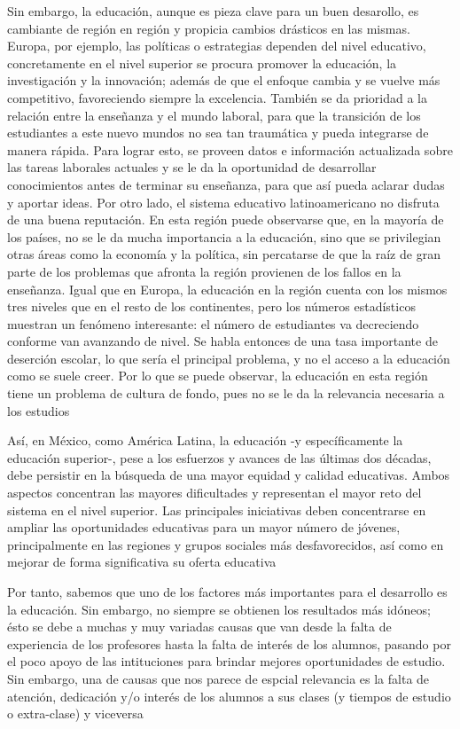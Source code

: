 \noindent
Sin embargo, la educación, aunque es pieza clave para un buen desarollo, es cambiante de región en región y 
propicia cambios drásticos en las mismas. Europa, por ejemplo, las políticas o estrategias dependen del 
nivel educativo, concretamente en el nivel superior se procura promover la educación, la investigación y la 
innovación; además de que el enfoque cambia y se vuelve más competitivo, favoreciendo siempre la 
excelencia. También se da prioridad a la relación entre la enseñanza y el mundo laboral, para que la 
transición de los estudiantes a este nuevo mundos no sea tan traumática y pueda integrarse de manera 
rápida. Para lograr esto, se proveen datos e información actualizada sobre las tareas laborales actuales y 
se le da la oportunidad de desarrollar conocimientos antes de terminar su enseñanza, para que así pueda 
aclarar dudas y aportar ideas. Por otro lado, el sistema educativo latinoamericano no disfruta de una buena 
reputación. En esta región puede observarse que, en la mayoría de los países, no se le da mucha importancia 
a la educación, sino que se privilegian otras áreas como la economía y la política, sin percatarse de que 
la raíz de gran parte de los problemas que afronta la región provienen de los fallos en la enseñanza. 
Igual que en Europa, la educación en la región cuenta con los mismos tres niveles que en el resto de los 
continentes, pero los números estadísticos muestran un fenómeno interesante: el número de estudiantes va 
decreciendo conforme van avanzando de nivel. 
Se habla entonces de una tasa importante de deserción escolar, lo que sería el principal problema, y no el 
acceso a la educación como se suele creer.
Por lo que se puede observar, la educación en esta región tiene un problema de cultura de fondo, pues no se 
le da la relevancia necesaria a los estudios \cite{Sistemas_Educacion_Mundo}

\noindent
Así, en México, como América Latina, la educación -y específicamente la educación superior-, pese a los 
esfuerzos y avances de las últimas dos décadas, debe persistir en la búsqueda de una mayor equidad y 
calidad educativas. Ambos aspectos concentran las mayores dificultades y representan el mayor reto del 
sistema en el nivel superior. Las principales iniciativas deben concentrarse en ampliar las oportunidades 
educativas para un mayor número de jóvenes, principalmente en las regiones y grupos sociales más 
desfavorecidos, así como en mejorar de forma significativa su oferta educativa \cite{Estado_Educacion_UNAM}

\noindent
Por tanto, sabemos que uno de los factores más importantes para el desarrollo es la educación. Sin embargo, 
no siempre se obtienen  los resultados más idóneos; ésto se debe a muchas y muy variadas causas que van 
desde la falta de experiencia de los profesores hasta la falta de interés de los alumnos, pasando por el 
poco apoyo de las intituciones para brindar mejores oportunidades de estudio. Sin embargo, una de causas 
que nos parece de espcial relevancia es la falta de atención, dedicación y/o interés de los alumnos a sus 
clases (y tiempos de estudio o extra-clase) y viceversa \cite{Importancia_Educacion_UNAM}

